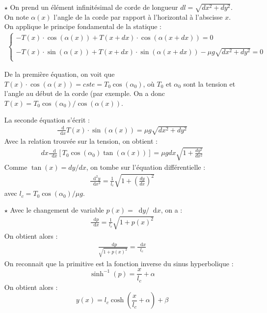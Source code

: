 \documentclass{report}
\newcommand*\dif{\mathop{}\!\mathrm{d}}
\begin{document}
\begin{itemize}

	\item[$\star$] On prend un élément infinitésimal de corde de longueur $dl=\sqrt{dx^2+dy^2}$. On note $\alpha(x)$ l'angle de la corde par rapport à l'horizontal à l'abscisse $x$. On applique le principe fondamental de la statique :
	\begin{align*}
	\left\lbrace
	\begin{array}{ccc}
	-T(x)\cdot\cos(\alpha(x))+T(x+dx)\cdot\cos(\alpha(x+dx))=0\\
	\\
	-T(x)\cdot\sin(\alpha(x))+T(x+dx)\cdot\sin(\alpha(x+dx))-\mu g\sqrt{dx^2+dy^2}=0\\
	\end{array}\right.
	\end{align*}		
	
	De la première équation, on voit que $T(x)\cdot\cos(\alpha(x))=cste=T_0\cos(\alpha_0)$, où $T_0$ et $\alpha_0$ sont la tension et l'angle au début de la corde (par exemple. On a donc $T(x)=T_0\cos(\alpha_0)/\cos(\alpha(x))$.
	
	La seconde équation s'écrit :
	\begin{align*}
		\frac{\dif }{\dif x}T(x)\cdot\sin(\alpha(x))=\mu g \sqrt{dx^2+dy^2}
	\end{align*}
	Avec la relation trouvée sur la tension, on obtient :
	\begin{align*}
		dx\frac{\dif }{\dif x}\left[T_0\cos(\alpha_0)\tan(\alpha(x))\right] =\mu g dx\sqrt{1+\frac{dy^2}{dx^2}}
	\end{align*}
	Comme $\tan(x)=dy/dx$, on tombe sur l'équation différentielle :
	\begin{align*}
		\frac{\dif^2 y}{\dif x^2} =\frac{1}{l_c}\sqrt{1+\left( \frac{dy}{dx}\right)^2}
	\end{align*}	
	avec $l_c=T_0\cos(\alpha_0)/\mu g$.
	\item[$\star$] Avec le changement de variable $p(x)=\dif y/\dif x$, on a :
	\begin{align*}
		\frac{\dif p}{\dif x} =\frac{1}{l_c}\sqrt{1+p(x)^2}
	\end{align*}	
	On obtient alors :
	\begin{align*}
		\frac{\dif p}{\sqrt{1+p(x)^2}} =\frac{\dif x}{l_c}
	\end{align*}	
	On reconnait que la primitive est la fonction inverse du sinus hyperbolique :
	\begin{equation}
		\sinh^{-1}(p)=\frac{x}{l_c} +\alpha
	\end{equation}
	On obtient alors :
	\begin{equation}
		y(x) = l_c\cosh\left( \frac{x}{l_c}+\alpha\right) +\beta
	\end{equation}
	

\end{itemize}
\end{document}
